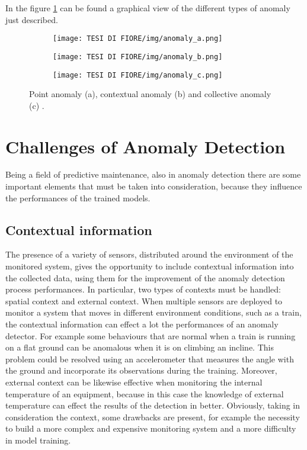 In the figure \ref{anomalies} can be found a graphical view of the different types of anomaly just described. 
\begin{figure}[ht]
\centering
\begin{subfigure}
    \centering
    \texttt{[image: TESI DI FIORE/img/anomaly\_a.png]}
\end{subfigure}
\begin{subfigure}
    \centering
    \texttt{[image: TESI DI FIORE/img/anomaly\_b.png]}
\end{subfigure}
\begin{subfigure}
    \centering
    \texttt{[image: TESI DI FIORE/img/anomaly\_c.png]}
\end{subfigure}
\caption{Point anomaly (a), contextual anomaly (b) and collective anomaly (c) \cite{6AnomalyIoTTimeSeries}.}
\label{anomalies}
\end{figure}

\section{Challenges of Anomaly Detection}
Being a field of predictive maintenance, also in anomaly detection there are some important elements that must be taken into consideration, because they influence the performances of the trained models.
\subsection{Contextual information}
The presence of a variety of sensors, distributed around the environment of the monitored system, gives the opportunity to include contextual information into the collected data, using them for the improvement of the anomaly detection process performances. In particular, two types of contexts must be handled: spatial context and external context. When multiple sensors are deployed to monitor a system that moves in different environment conditions, such as a train, the contextual information can effect a lot the performances of an anomaly detector. For example some behaviours that are normal when a train is running on a flat ground can be anomalous when it is on climbing an incline. This problem could be resolved using an accelerometer that measures the angle with the ground and incorporate its observations during the training. Moreover, external context can be likewise effective when monitoring the internal temperature of an equipment, because in this case the knowledge of external temperature can effect the results of the detection in better. Obviously, taking in consideration the context, some drawbacks are present, for example the necessity to build a more complex and expensive monitoring system and a more difficulty in model training.
